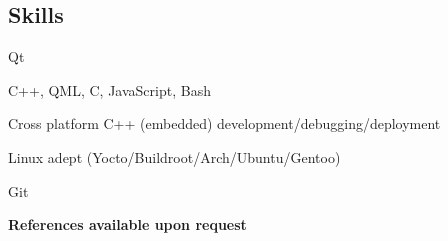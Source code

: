 \documentclass{article}
\begin{document}
\subsection*{Skills}
\begin{itemize*}
\item{Qt}
\item{C++, QML, C, JavaScript, Bash}
\item{Cross platform C++ (embedded) development/debugging/deployment}
\item{Linux adept (Yocto/Buildroot/Arch/Ubuntu/Gentoo)}
\item{Git}
\end{itemize*}

\bf{References available upon request}
 
\end{document}
